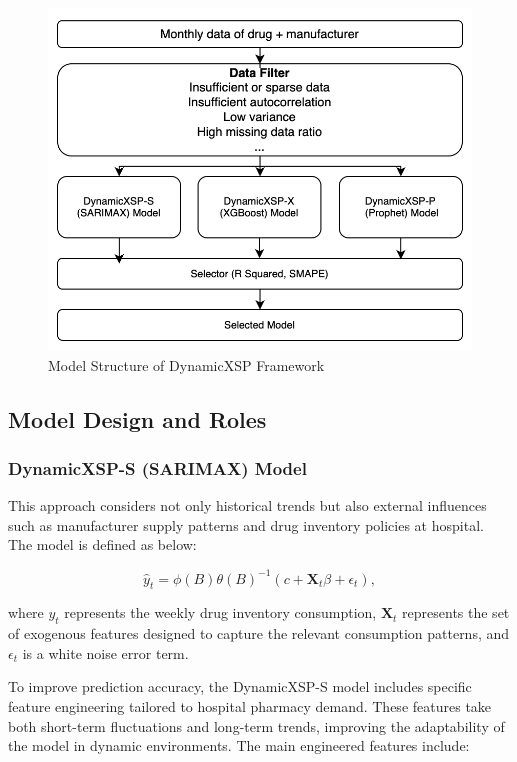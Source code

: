 \documentclass[journal]{IEEEtran}
\begin{document}
\begin{figure}[H]
    \centering
    \includegraphics[width=\linewidth]{./model_structure.png}
    \caption{Model Structure of DynamicXSP Framework}
    \label{fig:vitaminb1}
\end{figure}

\subsection{Model Design and Roles}
\subsubsection{DynamicXSP-S (SARIMAX) Model}

This approach considers not only historical trends but also external influences such as manufacturer supply patterns and drug inventory policies at hospital. The model is defined as below:

\begin{equation}
    \hat{y}_{t} = \phi(B)\theta(B)^{-1} \left( c + \mathbf{X}_{t}\beta + \epsilon_{t} \right),
\end{equation}

where \(y_{t}\) represents the weekly drug inventory consumption, \(\mathbf{X}_{t}\) represents the set of exogenous features designed to capture the relevant consumption patterns, and \(\epsilon_{t}\) is a white noise error term.

To improve prediction accuracy, the DynamicXSP-S model includes specific feature engineering tailored to hospital pharmacy demand. These features take both short-term fluctuations and long-term trends, improving the adaptability of the model in dynamic environments. The main engineered features include:
\end{document}
